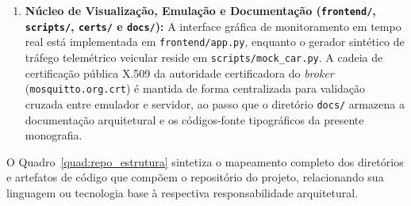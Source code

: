 \documentclass[
	12pt,				%
	openright,			%
	twoside,			%
	a4paper,			%
	english,			%
	brazil				%
	]{abntex2}
\begin{document}
\begin{enumerate}
        \texttt{test\_main.py} e \texttt{test\_mqtt.py}.
    \item \textbf{Núcleo de Visualização, Emulação e Documentação (\texttt{frontend/},
        \texttt{scripts/}, \texttt{certs/} e \texttt{docs/}):} A interface gráfica de
        monitoramento em tempo real está implementada em
        \texttt{frontend/\allowbreak app.py}, enquanto o gerador sintético de tráfego
        telemétrico veicular reside em \texttt{scripts/\allowbreak mock\_car.py}. A
        cadeia de certificação pública X.509 da autoridade certificadora do
        \textit{broker} (\texttt{mosquitto.org.crt}) é mantida de forma centralizada
        para validação cruzada entre emulador e servidor, ao passo que o diretório
        \texttt{docs/} armazena a documentação arquitetural e os códigos-fonte
        tipográficos da presente monografia.
\end{enumerate}

O Quadro~\ref{quad:repo_estrutura} sintetiza o mapeamento completo dos diretórios e
artefatos de código que compõem o repositório do projeto, relacionando sua linguagem ou
tecnologia base à respectiva responsabilidade arquitetural.
\end{document}
